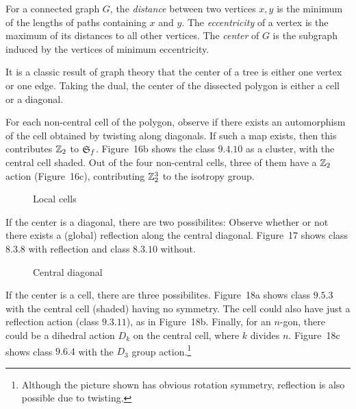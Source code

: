 \documentclass[10pt]{amsart}
\begin{document}
        \begin{defn}
        For a connected graph $G$, the {\em distance} between two vertices $x, y$ is the minimum of the lengths of paths containing $x$ and $y$. The {\em eccentricity} of a vertex is the maximum of its distances to all other vertices.  The {\em center} of $G$ is the subgraph induced by the vertices of minimum eccentricity.
        \end{defn}
        
        \noindent It is a classic result of graph theory that the center of a tree is either one vertex or one edge. Taking the dual, the center of the dissected polygon is either a cell or a diagonal.
        
         For each non-central cell of the polygon, observe if there exists an automorphism of the cell obtained by twisting along diagonals. If such a map exists, then this contributes ${\mathbb Z}_2$ to ${\mathfrak S}_f$.  Figure~16b shows the class $9.4.10$ as a cluster, with the central cell shaded. Out of the four non-central cells, three of them have a ${\mathbb Z}_2$ action (Figure~16c), contributing ${\mathbb Z}_2^3$ to the isotropy group.
        
        \begin{figure}[h]
        \caption{Local cells}
        \label{localcell}
        \end{figure}
        
         If the center is a diagonal, there are two possibilites: Observe whether or not there exists a (global) reflection along the central diagonal.  Figure~17 shows class $8.3.8$ with reflection and class $8.3.10$ without.
        
        \begin{figure}[h]
        \caption{Central diagonal}
        \label{centerdiag}
        \end{figure}
        
         If the center is a cell, there are three possibilites.  Figure~18a shows class $9.5.3$ with the central cell (shaded) having no symmetry. The cell could also have just a reflection action (class $9.3.11$), as in Figure~18b. Finally, for an $n$-gon, there could be a dihedral action $D_k$ on the central cell, where $k$ divides $n$.  Figure~18c shows class $9.6.4$ with the $D_3$ group action.\footnote{Although the picture shown has obvious  rotation symmetry, reflection is also possible due to twisting.}
        
\end{document}
